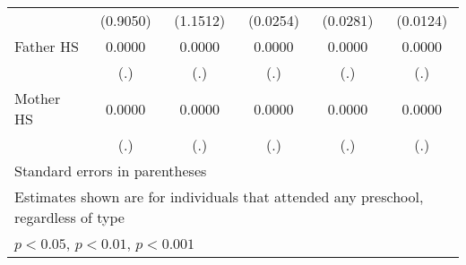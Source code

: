 \begin{table}[htbp]
\begin{tabular}{l*{5}{c}}
            &    (0.9050)         &    (1.1512)         &    (0.0254)         &    (0.0281)         &    (0.0124)         \\
\addlinespace
Father HS   &      0.0000         &      0.0000         &      0.0000         &      0.0000         &      0.0000         \\
            &         (.)         &         (.)         &         (.)         &         (.)         &         (.)         \\
\addlinespace
Mother HS   &      0.0000         &      0.0000         &      0.0000         &      0.0000         &      0.0000         \\
            &         (.)         &         (.)         &         (.)         &         (.)         &         (.)         \\
\bottomrule
\multicolumn{6}{l}{\footnotesize Standard errors in parentheses}\\
\multicolumn{6}{l}{\footnotesize Estimates shown are for individuals that attended any preschool, regardless of type}\\
\multicolumn{6}{l}{\footnotesize \sym{*} \(p<0.05\), \sym{**} \(p<0.01\), \sym{***} \(p<0.001\)}\\
\end{tabular}
\end{table}
